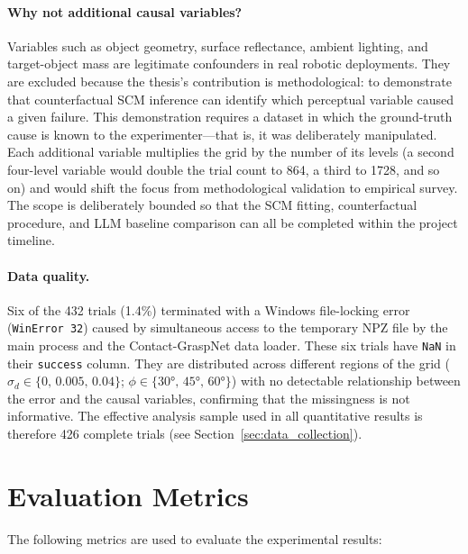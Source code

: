\documentclass[11pt,a4paper]{report}
\begin{document}
\paragraph{Why not additional causal variables?}
Variables such as object geometry, surface reflectance, ambient lighting, and target-object mass are legitimate confounders in real robotic deployments. They are excluded because the thesis's contribution is methodological: to demonstrate that counterfactual SCM inference can identify which perceptual variable caused a given failure. This demonstration requires a dataset in which the ground-truth cause is known to the experimenter---that is, it was deliberately manipulated. Each additional variable multiplies the grid by the number of its levels (a second four-level variable would double the trial count to 864, a third to 1728, and so on) and would shift the focus from methodological validation to empirical survey. The scope is deliberately bounded so that the SCM fitting, counterfactual procedure, and LLM baseline comparison can all be completed within the project timeline.

\paragraph{Data quality.}
Six of the 432 trials (1.4\%) terminated with a Windows file-locking error (\texttt{WinError~32}) caused by simultaneous access to the temporary NPZ file by the main process and the Contact-GraspNet data loader. These six trials have \texttt{NaN} in their \texttt{success} column. They are distributed across different regions of the grid ($\sigma_d \in \{0,\,0.005,\,0.04\}$; $\phi \in \{30°,\,45°,\,60°\}$) with no detectable relationship between the error and the causal variables, confirming that the missingness is not informative. The effective analysis sample used in all quantitative results is therefore 426 complete trials (see Section~\ref{sec:data_collection}).

\section{Evaluation Metrics}
\label{sec:metrics}

The following metrics are used to evaluate the experimental results:
\end{document}
